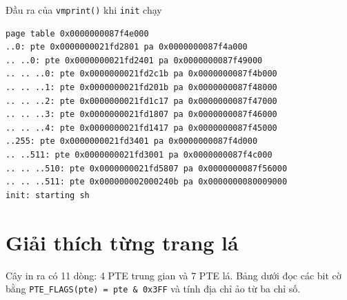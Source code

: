 \begin{codebox}[vmprintOut]{Đầu ra của \texttt{vmprint()} khi \texttt{init} chạy}
    \begin{verbatim}
page table 0x0000000087f4e000
..0: pte 0x0000000021fd2801 pa 0x0000000087f4a000
.. ..0: pte 0x0000000021fd2401 pa 0x0000000087f49000
.. .. ..0: pte 0x0000000021fd2c1b pa 0x0000000087f4b000
.. .. ..1: pte 0x0000000021fd201b pa 0x0000000087f48000
.. .. ..2: pte 0x0000000021fd1c17 pa 0x0000000087f47000
.. .. ..3: pte 0x0000000021fd1807 pa 0x0000000087f46000
.. .. ..4: pte 0x0000000021fd1417 pa 0x0000000087f45000
..255: pte 0x0000000021fd3401 pa 0x0000000087f4d000
.. ..511: pte 0x0000000021fd3001 pa 0x0000000087f4c000
.. .. ..510: pte 0x0000000021fd5807 pa 0x0000000087f56000
.. .. ..511: pte 0x000000002000240b pa 0x0000000080009000
init: starting sh
    \end{verbatim}
\end{codebox}

\section{Giải thích từng trang lá}

Cây in ra có 11 dòng: 4 PTE trung gian và 7 PTE lá. Bảng dưới đọc các bit cờ bằng \texttt{PTE\_FLAGS(pte) = pte \& 0x3FF} và tính địa chỉ ảo từ ba chỉ số.

